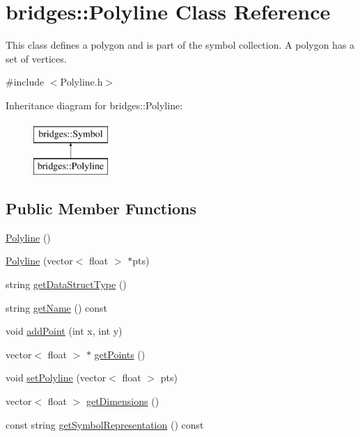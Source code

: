 \hypertarget{classbridges_1_1_polyline}{}\section{bridges\+:\+:Polyline Class Reference}
\label{classbridges_1_1_polyline}


This class defines a polygon and is part of the symbol collection. A polygon has a set of vertices.  




{\ttfamily \#include $<$Polyline.\+h$>$}

Inheritance diagram for bridges\+:\+:Polyline\+:\begin{figure}[H]
\begin{center}
\leavevmode
\includegraphics[height=2.000000cm]{classbridges_1_1_polyline}
\end{center}
\end{figure}
\subsection*{Public Member Functions}
\begin{DoxyCompactItemize}
\item 
\mbox{\hyperlink{classbridges_1_1_polyline_a34e2defd0e7e1a95bef282ff43ce478b}{Polyline}} ()
\item 
\mbox{\hyperlink{classbridges_1_1_polyline_a332ddf6a9136701ce2502ab5b2805d9c}{Polyline}} (vector$<$ float $>$ $\ast$pts)
\item 
string \mbox{\hyperlink{classbridges_1_1_polyline_a37e5e6648c889df79226f4f973457326}{get\+Data\+Struct\+Type}} ()
\item 
string \mbox{\hyperlink{classbridges_1_1_polyline_a829fe21ce52595ecb7473a4368b136d6}{get\+Name}} () const
\item 
void \mbox{\hyperlink{classbridges_1_1_polyline_a1f1d38171e5603ab6a17d714cb46add3}{add\+Point}} (int x, int y)
\item 
vector$<$ float $>$ $\ast$ \mbox{\hyperlink{classbridges_1_1_polyline_aab7bddeace9c9e9d5b296666dd9dede5}{get\+Points}} ()
\item 
void \mbox{\hyperlink{classbridges_1_1_polyline_adaae3e064c497291beb1ba3cacb4b9a0}{set\+Polyline}} (vector$<$ float $>$ pts)
\item 
vector$<$ float $>$ \mbox{\hyperlink{classbridges_1_1_polyline_aa0ce633fa1bb6460f507fe98026de443}{get\+Dimensions}} ()
\item 
const string \mbox{\hyperlink{classbridges_1_1_polyline_a850d2f619466b159c7874317f9eaf0a3}{get\+Symbol\+Representation}} () const
\end{DoxyCompactItemize}
